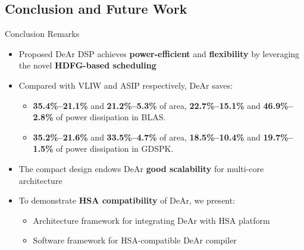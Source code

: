 \documentclass{beamer}
\begin{document}
\begin{CJK}{UTF8}{bkai}
            \section{Conclusion and Future Work}
            \begin{frame}{Conclusion Remarks}
                \begin{itemize}
                    \item <2->{Proposed DeAr DSP achieves \textbf{power-efficient} and \textbf{flexibility} by leveraging the novel \textbf{HDFG-based scheduling}}
                    \item <3->{Compared with VLIW and ASIP respectively, DeAr saves:
                            \begin{itemize}
                                \item \textbf{35.4\%--21.1\%} and \textbf{21.2\%--5.3\%} of area, \textbf{22.7\%--15.1\%} and \textbf{46.9\%--2.8\%} of power dissipation in BLAS.
                                \item \textbf{35.2\%--21.6\%} and \textbf{33.5\%--4.7\%} of area, \textbf{18.5\%--10.4\%} and \textbf{19.7\%--1.5\%} of power dissipation in GDSPK.
                            \end{itemize}
                        }
                    \item <4->{The compact design endows DeAr \textbf{good scalability} for multi-core architecture}
                    \item <5->{To demonstrate \textbf{HSA compatibility} of DeAr, we present:
                            \begin{itemize}
                                \item Architecture framework for integrating DeAr with HSA platform
                                \item Software framework for HSA-compatible DeAr compiler
                            \end{itemize}
                        }
                \end{itemize}
            \end{frame}


\end{CJK}
\end{document}
